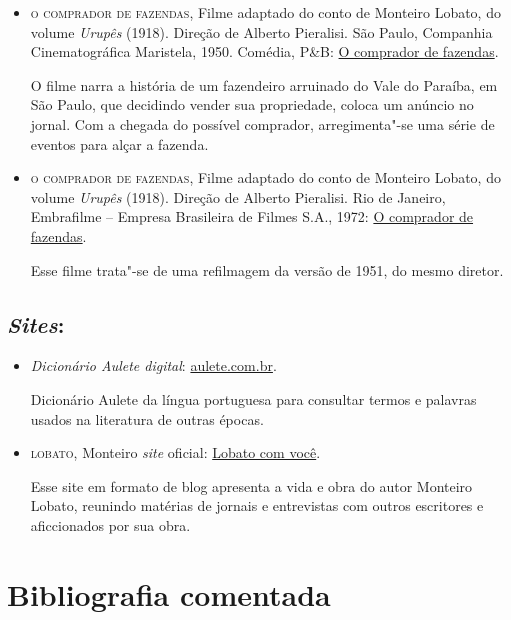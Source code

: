 \documentclass[11pt]{extarticle}
\begin{document}
\begin{itemize}

\item \textsc{o comprador de fazendas}, Filme adaptado do conto de Monteiro
Lobato, do volume \emph{Urupês} (1918). Direção de Alberto Pieralisi.
São Paulo, Companhia Cinematográfica Maristela, 1950. Comédia, P\&B:
\href{https://www.youtube.com/watch?v=LcdfdfD9_Bs}{O comprador de fazendas}.

O filme narra a história de um fazendeiro arruinado do Vale do Paraíba, em
São Paulo, que decidindo vender sua propriedade, coloca um anúncio no jornal.
Com a chegada do possível comprador, arregimenta"-se uma série de eventos para 
alçar a fazenda. 

\item  \textsc{o comprador de fazendas}, Filme adaptado do conto de Monteiro
Lobato, do volume \emph{Urupês} (1918). Direção de Alberto Pieralisi.
Rio de Janeiro, Embrafilme -- Empresa Brasileira de Filmes S.A., 1972:
\href{https://www.youtube.com/watch?v=C9OrDOQWm5o}{O comprador de fazendas}.

Esse filme trata"-se de uma refilmagem da versão de 1951, do mesmo 
diretor. 

\end{itemize}

\subsection{\emph{Sites}:}

\begin{itemize}


\item  \emph{Dicionário Aulete digital}: \href{http://www.aulete.com.br/}{aulete.com.br}.

Dicionário Aulete da língua portuguesa para consultar termos e palavras 
usados na literatura de outras épocas.

\item  \textsc{lobato}, Monteiro  \emph{site} oficial:
\href{https://lobato.com.vc//}{Lobato com você}.

Esse site em formato de blog apresenta a vida e obra do autor Monteiro Lobato, 
reunindo matérias de jornais e entrevistas com outros escritores e aficcionados 
por sua obra. 

\end{itemize}

\section{Bibliografia comentada}
\end{document}
